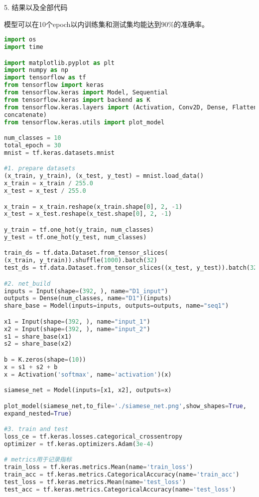 \documentclass{article}
\begin{document}
    
    5. 结果以及全部代码
    
    模型可以在10个epoch以内训练集和测试集均能达到90\%的准确率。
    
\begin{lstlisting}[language=Python]
import os
import time

import matplotlib.pyplot as plt
import numpy as np
import tensorflow as tf
from tensorflow import keras
from tensorflow.keras import Model, Sequential
from tensorflow.keras import backend as K
from tensorflow.keras.layers import (Activation, Conv2D, Dense, Flatten, Input,
concatenate)
from tensorflow.keras.utils import plot_model

num_classes = 10
total_epoch = 30
mnist = tf.keras.datasets.mnist

#1. prepare datasets
(x_train, y_train), (x_test, y_test) = mnist.load_data()
x_train = x_train / 255.0
x_test = x_test / 255.0

x_train = x_train.reshape(x_train.shape[0], 2, -1)
x_test = x_test.reshape(x_test.shape[0], 2, -1)

y_train = tf.one_hot(y_train, num_classes)
y_test = tf.one_hot(y_test, num_classes)

train_ds = tf.data.Dataset.from_tensor_slices(
(x_train, y_train)).shuffle(1000).batch(32)
test_ds = tf.data.Dataset.from_tensor_slices((x_test, y_test)).batch(32)

#2. net_build
inputs = Input(shape=(392, ), name="D1_input")
outputs = Dense(num_classes, name="D1")(inputs)
share_base = Model(inputs=inputs, outputs=outputs, name="seq1")

x1 = Input(shape=(392, ), name="input_1")
x2 = Input(shape=(392, ), name="input_2")
s1 = share_base(x1)
s2 = share_base(x2)

b = K.zeros(shape=(10))
x = s1 + s2 + b
x = Activation('softmax', name='activation')(x)

siamese_net = Model(inputs=[x1, x2], outputs=x)

plot_model(siamese_net,to_file='./siamese_net.png',show_shapes=True,
expand_nested=True)

#3. train and test
loss_ce = tf.keras.losses.categorical_crossentropy
optimizer = tf.keras.optimizers.Adam(3e-4)

# metrics用于记录指标
train_loss = tf.keras.metrics.Mean(name='train_loss')
train_acc = tf.keras.metrics.CategoricalAccuracy(name='train_acc')
test_loss = tf.keras.metrics.Mean(name='test_loss')
test_acc = tf.keras.metrics.CategoricalAccuracy(name='test_loss')


\end{lstlisting}
\end{document}
